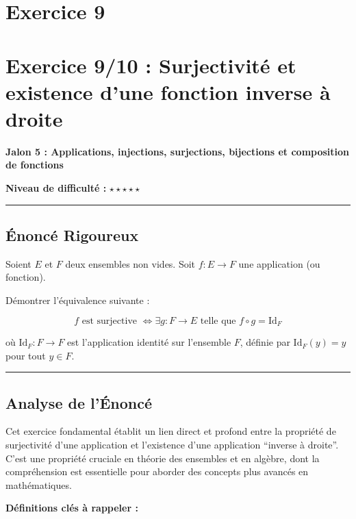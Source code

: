 \documentclass[12pt,a4paper]{report}
\begin{document}
\section{Exercice 9}
\section{Exercice 9/10 : Surjectivité et existence d'une fonction
inverse à
droite}\label{exercice-910-surjectivituxe9-et-existence-dune-fonction-inverse-uxe0-droite}

\textbf{Jalon 5 : Applications, injections, surjections, bijections et
composition de fonctions}

\textbf{Niveau de difficulté :} \(\star\star\star\star\star\)

\begin{center}\rule{0.5\linewidth}{0.5pt}\end{center}

\subsection{Énoncé Rigoureux}\label{uxe9noncuxe9-rigoureux}

Soient \(E\) et \(F\) deux ensembles non vides. Soit \(f: E \to F\) une
application (ou fonction).

Démontrer l'équivalence suivante :

\[
f \text{ est surjective } \iff \exists g: F \to E \text{ telle que } f \circ g = \text{Id}_F
\]

où \(\text{Id}_F: F \to F\) est l'application identité sur l'ensemble
\(F\), définie par \(\text{Id}_F(y) = y\) pour tout \(y \in F\).

\begin{center}\rule{0.5\linewidth}{0.5pt}\end{center}

\subsection{Analyse de l'Énoncé}\label{analyse-de-luxe9noncuxe9}

Cet exercice fondamental établit un lien direct et profond entre la
propriété de surjectivité d'une application et l'existence d'une
application ``inverse à droite''. C'est une propriété cruciale en
théorie des ensembles et en algèbre, dont la compréhension est
essentielle pour aborder des concepts plus avancés en mathématiques.

\textbf{Définitions clés à rappeler :}
\end{document}
